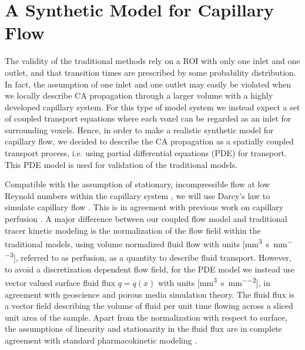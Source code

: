 \documentclass[journal,twocolumn]{IEEEtran}
\newcommand{\siQmm}{\milli\meter\cubed\per\second\per\milli\meter\cubed}
\newcommand{\siq}{\milli\meter\cubed\per\second\per\milli\meter\squared}
\begin{document}
	\section{A Synthetic Model for Capillary Flow}\label{sec:synthetic}
	
	The validity of the traditional methods rely on a ROI with only one inlet and one outlet, and that transition times are prescribed by some probability distribution.
	In fact, the assumption of one inlet and one outlet  may easily be violated when we locally describe CA propagation through a larger volume with a highly developed capillary system.
	For this type of model system we instead expect a set of coupled transport equations where each voxel can be regarded as an inlet for surrounding voxels.
	Hence, in order to make a realistic synthetic model for capillary flow, we decided to describe the CA propagation as a spatially coupled transport process, i.e. using partial differential equations (PDE) for transport. This PDE model is used for validation of the traditional models. 
	
	Compatible with the assumption of stationary, incompressible flow at low Reynold numbers within the capillary system \cite{Cho2011}, we will use Darcy's law to simulate capillary flow \cite{Darcy56}. This is in agreement with previous work on capillary perfusion \cite{Cookson2012,Michler2013}. 
	A major difference between our coupled flow model and traditional tracer kinetic modeling is the normalization of the flow field within the traditional models,
using volume normalized fluid flow with units [\si{\siQmm}], referred to as perfusion, as a quantity to describe fluid transport. 
	However, to avoid a discretization dependent flow field, for the PDE model we instead use vector valued surface fluid flux $q = q(x)$ with units [\si{\siq}], in agreement with geoscience and porous media simulation theory.
	The fluid flux is a vector field describing the volume of fluid per unit time flowing across a sliced unit area of the sample.	
	Apart from the normalization with respect to surface, the assumptions of linearity and stationarity in the fluid flux are in complete agreement with standard pharmacokinetic modeling \cite{sourbron13}.
	
\end{document}
